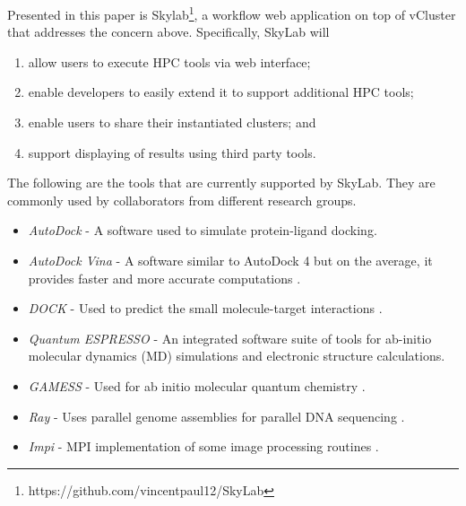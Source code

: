 Presented in this paper is Skylab\footnote{https://github.com/vincentpaul12/SkyLab}, a workflow web application on top of vCluster that addresses the concern above. Specifically, SkyLab will  

\begin{enumerate}
	\item allow users to execute HPC tools via web interface; 
	\item enable developers to easily extend it to support additional HPC tools;
	\item enable users to share their instantiated clusters; and
	\item support displaying of results using third party tools.
\end{enumerate}
   
The following are the tools that are currently supported by SkyLab. They are commonly used by collaborators from different research groups.

\begin{itemize}
    	\item \textit{AutoDock} - A software used to simulate protein-ligand docking\cite{morris2009autodock4}.

        \item \textit{AutoDock Vina} - A software similar to AutoDock 4 but on the average, it provides faster and more accurate computations \cite{JCC:JCC21334}. 
            
		\item \textit{DOCK} - Used to predict the small molecule-target interactions    \cite{lang2009dock}.
            
      	\item \textit{Quantum ESPRESSO} - An integrated software suite of tools for ab-initio molecular dynamics (MD) simulations and electronic structure calculations\cite{QE-2009}.

  		\item \textit{GAMESS} - Used for ab initio molecular quantum chemistry  \cite{1993gamess}.
            
 	    \item \textit{Ray} - Uses parallel genome assemblies for parallel DNA sequencing \cite{boisvert_ray_2012}.
 	    
 	    \item \textit{Impi} - MPI implementation of some image processing routines \cite{trajano2010}. 

\end{itemize}   
      
